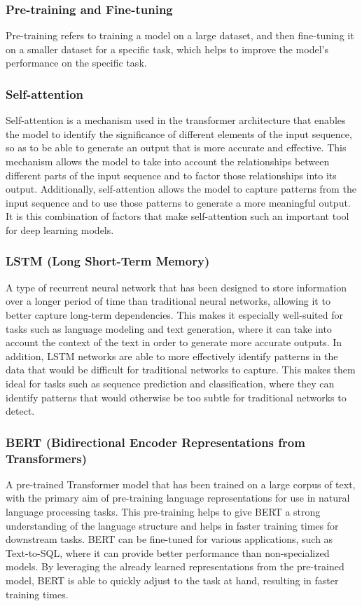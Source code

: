 \subsubsection{Pre-training and Fine-tuning} Pre-training refers to training a model on a large dataset, and then fine-tuning it on a smaller dataset for a specific task, which helps to improve the model's performance on the specific task.
\subsubsection{Self-attention} Self-attention is a mechanism used in the transformer architecture that enables the model to identify the significance of different elements of the input sequence, so as to be able to generate an output that is more accurate and effective. This mechanism allows the model to take into account the relationships between different parts of the input sequence and to factor those relationships into its output. Additionally, self-attention allows the model to capture patterns from the input sequence and to use those patterns to generate a more meaningful output. It is this combination of factors that make self-attention such an important tool for deep learning models.
\subsubsection{LSTM (Long Short-Term Memory)} A type of recurrent neural network that has been designed to store information over a longer period of time than traditional neural networks, allowing it to better capture long-term dependencies. This makes it especially well-suited for tasks such as language modeling and text generation, where it can take into account the context of the text in order to generate more accurate outputs. In addition, LSTM networks are able to more effectively identify patterns in the data that would be difficult for traditional networks to capture. This makes them ideal for tasks such as sequence prediction and classification, where they can identify patterns that would otherwise be too subtle for traditional networks to detect.
\subsubsection{BERT (Bidirectional Encoder Representations from Transformers)} A pre-trained Transformer model that has been trained on a large corpus of text, with the primary aim of pre-training language representations for use in natural language processing tasks. This pre-training helps to give BERT a strong understanding of the language structure and helps in faster training times for downstream tasks. BERT can be fine-tuned for various applications, such as Text-to-SQL, where it can provide better performance than non-specialized models. By leveraging the already learned representations from the pre-trained model, BERT is able to quickly adjust to the task at hand, resulting in faster training times.
